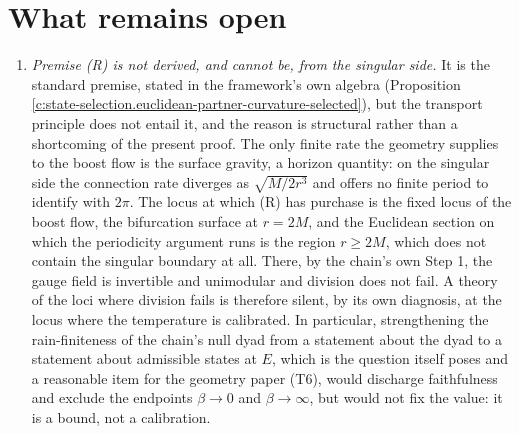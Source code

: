 \documentclass[11pt]{article}
\theoremstyle{definition}
\theoremstyle{plain}
\begin{document}
\section{What remains open}

\label{c:note.state-selection.setting-what-remains-open}
\begin{enumerate}
\item \emph{Premise (R) is not derived, and cannot be, from the singular side.} It is the standard premise, stated in the framework's own algebra (Proposition \ref{c:state-selection.euclidean-partner-curvature-selected}), but the transport principle does not entail it, and the reason is structural rather than a shortcoming of the present proof. The only finite rate the geometry supplies to the boost flow is the surface gravity, a horizon quantity: on the singular side the connection rate diverges as $\sqrt{M/2r^{3}}$ and offers no finite period to identify with $2\pi$. The locus at which (R) has purchase is the fixed locus of the boost flow, the bifurcation surface at $r = 2M$, and the Euclidean section on which the periodicity argument runs is the region $r \geq 2M$, which does not contain the singular boundary at all. There, by the chain's own Step 1, the gauge field is invertible and unimodular and division does not fail. A theory of the loci where division fails is therefore silent, by its own diagnosis, at the locus where the temperature is calibrated. In particular, strengthening the rain-finiteness of the chain's null dyad \cite[Prop.~8.23, Rem.~8.24]{ButlerT4} from a statement about the dyad to a statement about admissible states at $E$, which is the question \cite{ButlerT4} itself poses and a reasonable item for the geometry paper (T6), would discharge faithfulness and exclude the endpoints $\beta \to 0$ and $\beta \to \infty$, but would not fix the value: it is a bound, not a calibration.


\end{enumerate}
\end{document}
